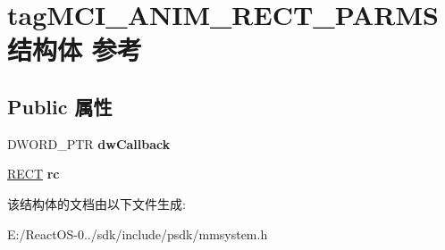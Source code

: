 \hypertarget{structtag_m_c_i___a_n_i_m___r_e_c_t___p_a_r_m_s}{}\section{tag\+M\+C\+I\+\_\+\+A\+N\+I\+M\+\_\+\+R\+E\+C\+T\+\_\+\+P\+A\+R\+M\+S结构体 参考}
\label{structtag_m_c_i___a_n_i_m___r_e_c_t___p_a_r_m_s}
\subsection*{Public 属性}
\begin{DoxyCompactItemize}
\item 
\mbox{\label{structtag_m_c_i___a_n_i_m___r_e_c_t___p_a_r_m_s_a4b39aeebb075b7a90162c5aae42bae30}} 
D\+W\+O\+R\+D\+\_\+\+P\+TR {\bfseries dw\+Callback}
\item 
\mbox{\label{structtag_m_c_i___a_n_i_m___r_e_c_t___p_a_r_m_s_a031f8630d554c61263701115cea0d8d3}} 
\hyperlink{structtag_r_e_c_t}{R\+E\+CT} {\bfseries rc}
\end{DoxyCompactItemize}


该结构体的文档由以下文件生成\+:\begin{DoxyCompactItemize}
\item 
E\+:/\+React\+O\+S-\/0../sdk/include/psdk/mmsystem.\+h\end{DoxyCompactItemize}
